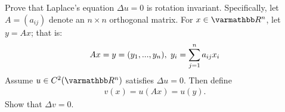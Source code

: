 \documentclass[10pt,oneside,openany]{memoir}
\begin{document}
\begin{problem}[manual-num={5}, note={Evans \S 2.5 Problem 2}]
    Prove that Laplace's equation $\Delta u = 0$ is rotation invariant. Specifically, let $A = (a_{ij})$ denote an $n \times n$ orthogonal matrix. For $x \in \bfR^n$, let $y = Ax$; that is:
        \begin{equation*}
        \begin{split}
            Ax = y = (y_1,...,y_n), \h3 y_i = \sum_{j = 1}^n a_{ij}x_i
        \end{split}
        \end{equation*}
    Assume $u \in C^2(\bfR^n)$ satisfies $\Delta u = 0$. Then define
        \begin{equation*}
        \begin{split}
            v(x) = u(Ax) = u(y).
        \end{split}
        \end{equation*}
    Show that $\Delta v = 0$.
\end{problem}
\end{document}
